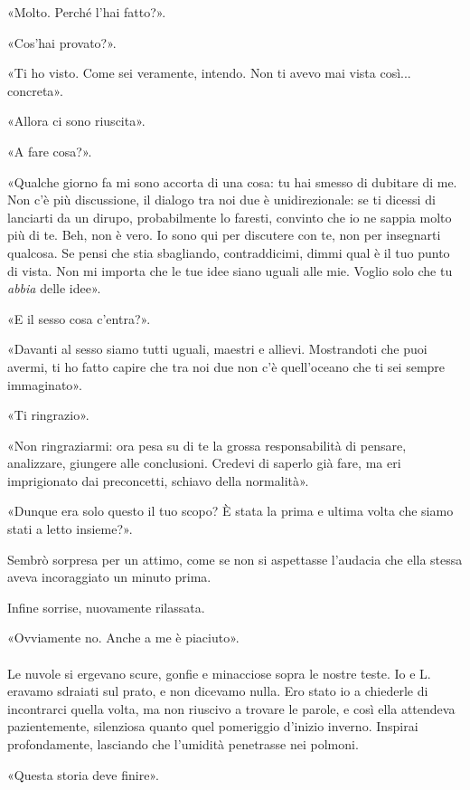 \documentclass[a4paper,12pt]{book}
\begin{document}
«Molto. Perché l'hai fatto?».

«Cos'hai provato?».

«Ti ho visto. Come sei veramente, intendo. Non ti avevo mai vista così...
concreta».

«Allora ci sono riuscita».

«A fare cosa?».

«Qualche giorno fa mi sono accorta di una cosa: tu hai smesso di dubitare di
me. Non c'è più discussione, il dialogo tra noi due è unidirezionale: se ti
dicessi di lanciarti da un dirupo, probabilmente lo faresti, convinto che io
ne sappia molto più di te. Beh, non è vero. Io sono qui per discutere con te,
non per insegnarti qualcosa. Se pensi che stia sbagliando, contraddicimi, dimmi
qual è il tuo punto di vista. Non mi importa che le tue idee siano uguali alle
mie. Voglio solo che tu \emph{abbia} delle idee».

«E il sesso cosa c'entra?».

«Davanti al sesso siamo tutti uguali, maestri e allievi. Mostrandoti che puoi
avermi, ti ho fatto capire che tra noi due non c'è quell'oceano che ti
sei sempre immaginato».

«Ti ringrazio».

«Non ringraziarmi: ora pesa su di te la grossa responsabilità di pensare,
analizzare, giungere alle conclusioni. Credevi di saperlo già fare, ma eri
imprigionato dai preconcetti, schiavo della normalità».

«Dunque era solo questo il tuo scopo? È stata la prima e ultima volta che siamo
stati a letto insieme?».

Sembrò sorpresa per un attimo, come se non si aspettasse l'audacia che ella
stessa aveva incoraggiato un minuto prima.

Infine sorrise, nuovamente rilassata.

«Ovviamente no. Anche a me è piaciuto».

\paragraph{}
Le nuvole si ergevano scure, gonfie e minacciose sopra le nostre teste. Io e L.
eravamo sdraiati sul prato, e non dicevamo nulla. Ero stato io a chiederle di
incontrarci quella volta, ma non riuscivo a trovare le parole, e così ella
attendeva pazientemente, silenziosa quanto quel pomeriggio d'inizio inverno.
Inspirai profondamente, lasciando che l'umidità penetrasse nei polmoni.

«Questa storia deve finire».
\end{document}

